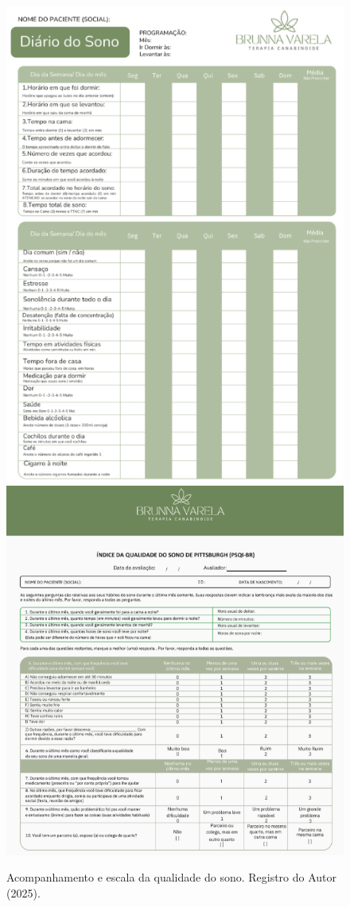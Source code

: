 \href{}{}\documentclass[12pt,portuguese,oneside]{article}
\begin{document}
\begin{figure}[H]
    \centering
    \includegraphics[width=0.4\linewidth]{imagens/sono.png}
    \includegraphics[width=0.4\linewidth]{imagens/qualidadesono.png}
    \caption{Acompanhamento e escala da qualidade do sono. Registro do Autor (2025).}
    \label{fig:sono.png}
\end{figure}
\end{document}
